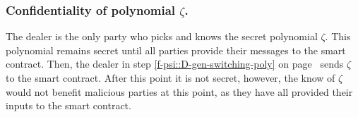 

\subsubsection{Confidentiality of polynomial $\zeta$.} 

The dealer is the only party who picks and knows the secret polynomial $\zeta$. 
This polynomial remains secret until all parties provide their messages to the smart contract. Then, the dealer in step \ref{f-psi::D-gen-switching-poly} on page~\pageref{f-psi::D-gen-switching-poly} sends $\zeta$ to the smart contract. After this point it is not secret, however, the know of $\zeta$ would not benefit malicious parties at this point, as they have all provided their inputs to the smart contract. 